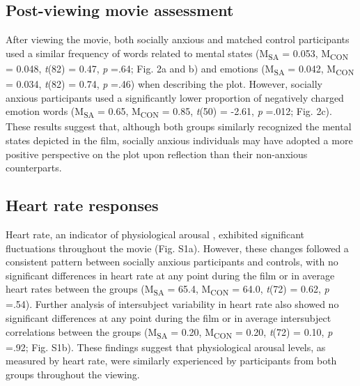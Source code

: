 \subsection*{Post-viewing movie assessment}
After viewing the movie, both socially anxious and matched control participants used a similar frequency of words related to mental states (M\textsubscript{SA} = 0.053, M\textsubscript{CON} = 0.048, \textit{t}(82) = 0.47, \textit{p} =.64; Fig. 2a and b) and emotions (M\textsubscript{SA} = 0.042, M\textsubscript{CON} = 0.034, \textit{t}(82) = 0.74, \textit{p} =.46) when describing the plot. However, socially anxious participants used a significantly lower proportion of negatively charged emotion words (M\textsubscript{SA} = 0.65, M\textsubscript{CON} = 0.85, \textit{t}(50) = -2.61, \textit{p} =.012; Fig. 2c). These results suggest that, although both groups similarly recognized the mental states depicted in the film, socially anxious individuals may have adopted a more positive perspective on the plot upon reflection than their non-anxious counterparts.

\subsection*{Heart rate responses}
Heart rate, an indicator of physiological arousal \citep{wascher2021}, exhibited significant fluctuations throughout the movie (Fig. S1a). However, these changes followed a consistent pattern between socially anxious participants and controls, with no significant differences in heart rate at any point during the film or in average heart rates between the groups (M\textsubscript{SA} = 65.4, M\textsubscript{CON} = 64.0, \textit{t}(72) = 0.62, \textit{p} =.54). Further analysis of intersubject variability in heart rate also showed no significant differences at any point during the film or in average intersubject correlations between the groups (M\textsubscript{SA} = 0.20, M\textsubscript{CON} = 0.20, \textit{t}(72) = 0.10, \textit{p} =.92; Fig. S1b). These findings suggest that physiological arousal levels, as measured by heart rate, were similarly experienced by participants from both groups throughout the viewing.

